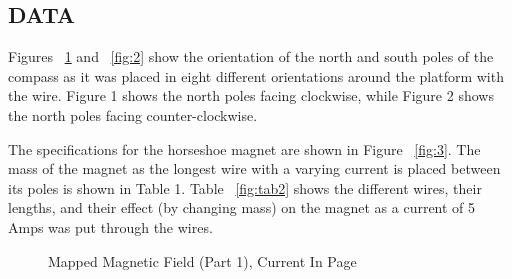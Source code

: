 \documentclass [12pt, letterpaper, twoside]{article}
\begin{document}
\subsection*{DATA}
Figures ~\ref{fig:1} and ~\ref{fig:2} show the orientation of the north and south poles of the compass as it was placed in eight different orientations around the platform with the wire. Figure 1 shows the north poles facing clockwise, while Figure 2 shows the north poles facing counter-clockwise.

\noindent
The specifications for the horseshoe magnet are shown in Figure ~\ref{fig:3}. The mass of the magnet as the longest wire with a varying current is placed between its poles is shown in Table 1. Table ~\ref{fig:tab2} shows the different wires, their lengths, and their effect (by changing mass) on the magnet as a current of 5 Amps was put through the wires.

\begin{figure}
  \centering
  \caption{Mapped Magnetic Field (Part 1), Current In Page}
  \label{fig:1}
\end{figure}
\end{document}
